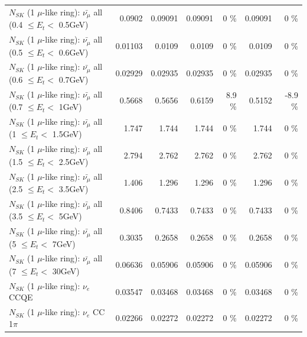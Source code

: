 \begin{table}
\begin{tabular}{| l | r | r | r  r | r  r |}
 $N_{SK}$ (1 $\mu$-like ring): $\bar{\nu_{\mu}}$ all (0.4 $\leq E_{t} <$ 0.5GeV) &          0.0902 &         0.09091 &         0.09091 &        0 \%  &         0.09091 &        0 \%  \\ 
 $N_{SK}$ (1 $\mu$-like ring): $\bar{\nu_{\mu}}$ all (0.5 $\leq E_{t} <$ 0.6GeV) &         0.01103 &          0.0109 &          0.0109 &        0 \%  &          0.0109 &        0 \%  \\ 
 $N_{SK}$ (1 $\mu$-like ring): $\bar{\nu_{\mu}}$ all (0.6 $\leq E_{t} <$ 0.7GeV) &         0.02929 &         0.02935 &         0.02935 &        0 \%  &         0.02935 &        0 \%  \\ 
   $N_{SK}$ (1 $\mu$-like ring): $\bar{\nu_{\mu}}$ all (0.7 $\leq E_{t} <$ 1GeV) &          0.5668 &          0.5656 &          0.6159 &      8.9 \%  &          0.5152 &     -8.9 \%  \\ 
   $N_{SK}$ (1 $\mu$-like ring): $\bar{\nu_{\mu}}$ all (1 $\leq E_{t} <$ 1.5GeV) &           1.747 &           1.744 &           1.744 &        0 \%  &           1.744 &        0 \%  \\ 
 $N_{SK}$ (1 $\mu$-like ring): $\bar{\nu_{\mu}}$ all (1.5 $\leq E_{t} <$ 2.5GeV) &           2.794 &           2.762 &           2.762 &        0 \%  &           2.762 &        0 \%  \\ 
 $N_{SK}$ (1 $\mu$-like ring): $\bar{\nu_{\mu}}$ all (2.5 $\leq E_{t} <$ 3.5GeV) &           1.406 &           1.296 &           1.296 &        0 \%  &           1.296 &        0 \%  \\ 
   $N_{SK}$ (1 $\mu$-like ring): $\bar{\nu_{\mu}}$ all (3.5 $\leq E_{t} <$ 5GeV) &          0.8406 &          0.7433 &          0.7433 &        0 \%  &          0.7433 &        0 \%  \\ 
     $N_{SK}$ (1 $\mu$-like ring): $\bar{\nu_{\mu}}$ all (5 $\leq E_{t} <$ 7GeV) &          0.3035 &          0.2658 &          0.2658 &        0 \%  &          0.2658 &        0 \%  \\ 
    $N_{SK}$ (1 $\mu$-like ring): $\bar{\nu_{\mu}}$ all (7 $\leq E_{t} <$ 30GeV) &         0.06636 &         0.05906 &         0.05906 &        0 \%  &         0.05906 &        0 \%  \\ 
\hline
\hline
\hline
                                      $N_{SK}$ (1 $\mu$-like ring): $\nu_e$ CCQE &         0.03547 &         0.03468 &         0.03468 &        0 \%  &         0.03468 &        0 \%  \\ 
                                 $N_{SK}$ (1 $\mu$-like ring): $\nu_e$ CC 1$\pi$ &         0.02266 &         0.02272 &         0.02272 &        0 \%  &         0.02272 &        0 \%  \\ 

\end{tabular}
\end{table}
